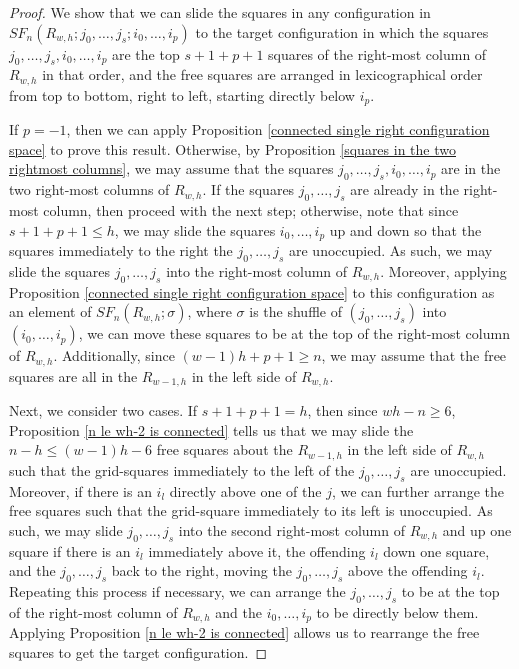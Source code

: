 \documentclass[pagebackref,colorlinks,citecolor=blue,linkcolor=blue,urlcolor=blue,filecolor=blue]{article}
\theoremstyle{definition}\newtheorem{definition}[thm]{Definition}
\theoremstyle{definition}
\begin{document}
\begin{proof}

We show that we can slide the squares in any configuration in $SF_{n}(R_{w,h}; j_{0}, \dots, j_{s};i_{0}, \dots, i_{p})$ to the target configuration in which the squares $j_{0}, \dots, j_{s}, i_{0},\dots, i_{p}$ are the top $s+1+p+1$ squares of the right-most column of $R_{w,h}$ in that order, and the free squares are arranged in lexicographical order from top to bottom, right to left, starting directly below $i_{p}$.

If $p=-1$, then we can apply Proposition \ref{connected single right configuration space} to prove this result.
Otherwise, by Proposition \ref{squares in the two rightmost columns}, we may assume that the squares $j_{0}, \dots, j_{s},i_{0}, \dots, i_{p}$ are in the two right-most columns of $R_{w,h}$.
If the squares $j_{0}, \dots, j_{s}$ are already in the right-most column, then proceed with the next step; otherwise, note that since $s+1+p+1\le h$, we may slide the squares $i_{0}, \dots, i_{p}$ up and down so that the squares immediately to the right the $j_{0}, \dots, j_{s}$ are unoccupied. 
As such, we may slide the squares $j_{0}, \dots, j_{s}$ into the right-most column of $R_{w,h}$.
Moreover, applying Proposition \ref{connected single right configuration space} to this configuration as an element of $SF_{n}(R_{w,h};\sigma)$, where $\sigma$ is the shuffle of $(j_{0},\dots, j_{s})$ into $(i_{0},\dots, i_{p})$, we can move these squares to be at the top of the right-most column of $R_{w,h}$.
Additionally, since $(w-1)h+p+1\ge n$, we may assume that the free squares are all in the $R_{w-1,h}$ in the left side of $R_{w,h}$.

Next, we consider two cases.
If $s+1+p+1=h$, then since $wh-n\ge 6$, Proposition \ref{n le wh-2 is connected} tells us that we may slide the $n-h\le(w-1)h-6$ free squares about the $R_{w-1,h}$ in the left side of $R_{w,h}$ such that the grid-squares immediately to the left of the $j_{0},\dots, j_{s}$ are unoccupied. 
Moreover, if there is an $i_{l}$ directly above one of the $j$, we can further arrange the free squares such that the grid-square immediately to its left is unoccupied.
As such, we may slide $j_{0}, \dots, j_{s}$ into the second right-most column of $R_{w,h}$ and up one square if there is an $i_{l}$ immediately above it, the offending $i_{l}$ down one square, and the $j_{0},\dots, j_{s}$ back to the right, moving the $j_{0},\dots, j_{s}$ above the offending $i_{l}$.
Repeating this process if necessary, we can arrange the $j_{0}, \dots, j_{s}$ to be at the top of the right-most column of $R_{w,h}$ and the $i_{0},\dots, i_{p}$ to be directly below them.
Applying Proposition \ref{n le wh-2 is connected} allows us to rearrange the free squares to get the target configuration.


\end{proof}
\end{document}

